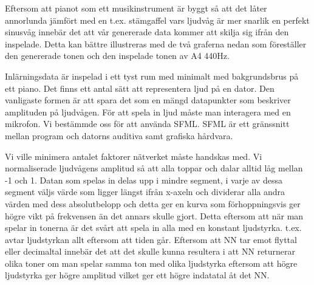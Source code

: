\documentclass[a4paper,10pt]{article}
\begin{document}
Eftersom att pianot som ett musikinstrument är byggt så att det låter annorlunda jämfört med en t.ex. stämgaffel vars ljudvåg är mer snarlik en perfekt sinusvåg innebär det att vår genererade data kommer att skilja sig ifrån den inspelade. Detta kan bättre illustreras med de två graferna nedan som föreställer den genererade tonen och den inspelade tonen av A4 440Hz. 
\begin{figure}[ht]
\end{figure}

Inlärningsdata är inspelad i ett tyst rum med minimalt med bakgrundsbrus på ett piano. 
Det finns ett antal sätt att representera ljud på en dator. Den vanligaste formen är att spara det som en mängd datapunkter som beskriver amplituden på ljudvågen.
För att spela in ljud måste man interagera med en mikrofon. Vi bestämmde oss för att använda SFML. SFML är ett gränssnitt mellan program och datorns auditiva samt grafiska hårdvara. 

Vi ville minimera antalet faktorer nätverket måste handskas med. Vi normaliserade ljudvågens amplitud så att alla toppar och dalar alltid låg mellan -1 och 1. Datan som spelas in delas upp i mindre segment, i varje av dessa segment väljs värde som ligger längst ifrån x-axeln och dividerar alla andra värden med dess absolutbelopp och detta ger en kurva som förhoppningsvis ger högre vikt på frekvensen än det annars skulle gjort. Detta eftersom att när man spelar in tonerna är det svårt att spela in alla med en konstant ljudstyrka. t.ex. avtar ljudstyrkan allt eftersom att tiden går. Eftersom att NN tar emot flyttal eller decimaltal innebär det att det skulle kunna resultera i att NN returnerar olika toner om man spelar samma ton med olika ljudstyrka eftersom att högre ljudstyrka ger högre amplitud vilket ger ett högre indatatal åt det NN.
\end{document}
